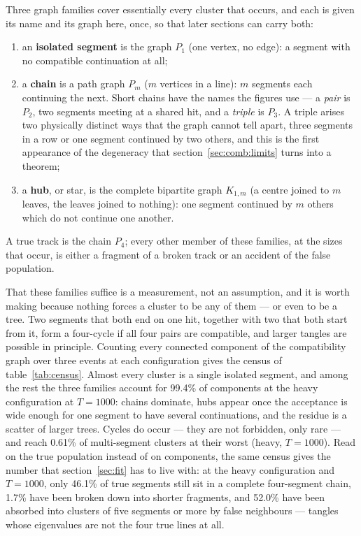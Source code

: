 \documentclass[11pt,a4paper]{article}
\begin{document}
Three graph families cover essentially every cluster that occurs, and each is
given its name and its graph here, once, so that later sections can carry both:
\begin{enumerate}[leftmargin=2em]
\item an \textbf{isolated segment} is the graph $P_1$ (one vertex, no edge): a
segment with no compatible continuation at all;
\item a \textbf{chain} is a path graph $P_m$ ($m$ vertices in a line): $m$
segments each continuing the next. Short chains have the names the figures use
--- a \emph{pair} is $P_2$, two segments meeting at a shared hit, and a
\emph{triple} is $P_3$. A triple arises two physically distinct ways that the
graph cannot tell apart, three segments in a row or one segment continued by
two others, and this is the first appearance of the degeneracy that
section~\ref{sec:comb:limits} turns into a theorem;
\item a \textbf{hub}, or star, is the complete bipartite graph $K_{1,m}$ (a
centre joined to $m$ leaves, the leaves joined to nothing): one segment
continued by $m$ others which do not continue one another.
\end{enumerate}
A true track is the chain $P_4$; every other member of these families, at the
sizes that occur, is either a fragment of a broken track or an accident of the
false population.

That these families suffice is a measurement, not an assumption, and it is
worth making because nothing forces a cluster to be any of them --- or even to
be a tree. Two segments that both end on one hit, together with two that both
start from it, form a four-cycle if all four pairs are compatible, and larger
tangles are possible in principle. Counting every connected component of the
compatibility graph over three events at each configuration gives the census of
table~\ref{tab:census}. Almost every cluster is a single isolated segment, and among the rest the three families account for 99.4\% of components at the heavy configuration at $T=1000$: chains dominate, hubs appear once the acceptance is wide enough for one segment to have several continuations, and the residue is a scatter of larger trees. Cycles do occur --- they are not forbidden, only rare --- and reach 0.61\% of multi-segment clusters at their worst (heavy, $T=1000$). Read on the true population instead of on components, the same census gives the number that section~\ref{sec:fit} has to live with: at the heavy configuration and $T=1000$, only 46.1\% of true segments still sit in a complete four-segment chain, 1.7\% have been broken down into shorter fragments, and 52.0\% have been absorbed into clusters of five segments or more by false neighbours --- tangles whose eigenvalues are not the four true lines at all.
\end{document}
